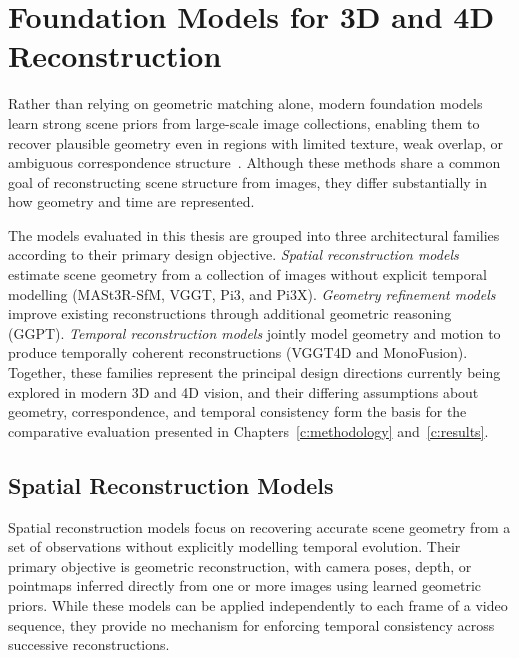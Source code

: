 \section{Foundation Models for 3D and 4D Reconstruction}
\label{sec:foundation_models}

Rather than relying on geometric matching alone, modern foundation models learn strong scene priors from large-scale image collections, enabling them to recover plausible geometry even in regions with limited texture, weak overlap, or ambiguous correspondence structure~\cite{dust3r,mast3r,vggt}. Although these methods share a common goal of reconstructing scene structure from images, they differ substantially in how geometry and time are represented.

The models evaluated in this thesis are grouped into three architectural families according to their primary design objective. \textit{Spatial reconstruction models} estimate scene geometry from a collection of images without explicit temporal modelling (MASt3R-SfM, VGGT, Pi3, and Pi3X). \textit{Geometry refinement models} improve existing reconstructions through additional geometric reasoning (GGPT). \textit{Temporal reconstruction models} jointly model geometry and motion to produce temporally coherent reconstructions (VGGT4D and MonoFusion). Together, these families represent the principal design directions currently being explored in modern 3D and 4D vision, and their differing assumptions about geometry, correspondence, and temporal consistency form the basis for the comparative evaluation presented in Chapters~\ref{c:methodology} and~\ref{c:results}.

\subsection{Spatial Reconstruction Models}
\label{sec:spatial_models}

Spatial reconstruction models focus on recovering accurate scene geometry from a set of observations without explicitly modelling temporal evolution. Their primary objective is geometric reconstruction, with camera poses, depth, or pointmaps inferred directly from one or more images using learned geometric priors. While these models can be applied independently to each frame of a video sequence, they provide no mechanism for enforcing temporal consistency across successive reconstructions.

